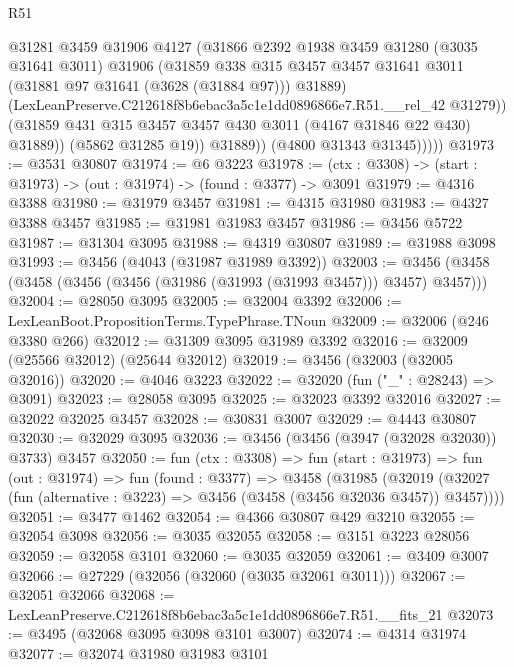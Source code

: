 \begin{lexlean}{R51}
\begin{coremodule}
                    @31281
                    @3459
                    @31906
                    @4127
                    (@31866
                      @2392
                      @1938
                      @3459
                      @31280
                      (@3035 @31641 @3011)
                      @31906
                      (@31859
                        @338
                        @315
                        @3457
                        @3457
                        @31641
                        @3011
                        (@31881 @97 @31641 (@3628 (@31884 @97)))
                        @31889)
                      (LexLeanPreserve.C212618f8b6ebac3a5c1e1dd0896866e7.R51.__rel_42 @31279))
                    (@31859 @431 @315 @3457 @3457 @430 @3011 (@4167 @31846 @22 @430) @31889))
                  (@5862 @31285 @19))
                @31889))
            (@4800 @31343 @31345)))))
@31973 := @3531 @30807
@31974 := @6 @3223
@31978 := (ctx : @3308) -> (start : @31973) -> (out : @31974) -> (found : @3377) -> @3091
@31979 := @4316 @3388
@31980 := @31979 @3457
@31981 := @4315 @31980
@31983 := @4327 @3388 @3457
@31985 := @31981 @31983 @3457
@31986 := @3456 @5722
@31987 := @31304 @3095
@31988 := @4319 @30807
@31989 := @31988 @3098
@31993 := @3456 (@4043 (@31987 @31989 @3392))
@32003 := @3456 (@3458 (@3458 (@3456 (@3456 (@31986 (@31993 (@31993 @3457))) @3457) @3457)))
@32004 := @28050 @3095
@32005 := @32004 @3392
@32006 := LexLeanBoot.PropositionTerms.TypePhrase.TNoun
@32009 := @32006 (@246 @3380 @266)
@32012 := @31309 @3095 @31989 @3392
@32016 := @32009 (@25566 @32012) (@25644 @32012)
@32019 := @3456 (@32003 (@32005 @32016))
@32020 := @4046 @3223
@32022 := @32020 (fun ("_" : @28243) => @3091)
@32023 := @28058 @3095
@32025 := @32023 @3392 @32016
@32027 := @32022 @32025 @3457
@32028 := @30831 @3007
@32029 := @4443 @30807
@32030 := @32029 @3095
@32036 := @3456 (@3456 (@3947 (@32028 @32030)) @3733) @3457
@32050 := fun (ctx : @3308) =>
  fun (start : @31973) =>
  fun (out : @31974) =>
  fun (found : @3377) =>
  @3458
    (@31985
      (@32019 (@32027 (fun (alternative : @3223) => @3456 (@3458 (@3456 @32036 @3457)) @3457))))
@32051 := @3477 @1462
@32054 := @4366 @30807 @429 @3210
@32055 := @32054 @3098
@32056 := @3035 @32055
@32058 := @3151 @3223 @28056
@32059 := @32058 @3101
@32060 := @3035 @32059
@32061 := @3409 @3007
@32066 := @27229 (@32056 (@32060 (@3035 @32061 @3011)))
@32067 := @32051 @32066
@32068 := LexLeanPreserve.C212618f8b6ebac3a5c1e1dd0896866e7.R51.__fits_21
@32073 := @3495 (@32068 @3095 @3098 @3101 @3007)
@32074 := @4314 @31974
@32077 := @32074 @31980 @31983 @3101

\end{coremodule}
\end{lexlean}
